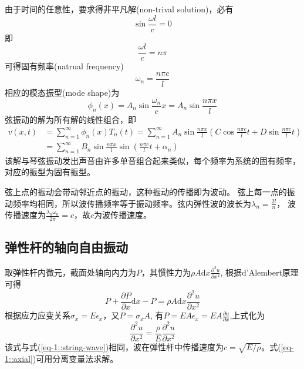 由于时间的任意性，要求得非平凡解(non-trival solution)，必有
\begin{equation}
    \sin \frac{\omega l}{c}=0
\end{equation}
即
\begin{equation}
    \frac{\omega l}{c}=n\pi
\end{equation}
可得固有频率(natrual frequency)
\begin{equation}
    \omega_{n}=\frac{n\pi c}{l}
\end{equation}
相应的模态振型(mode shape)为
\begin{equation}
    \phi_{n}(x)=A_{n}\sin\frac{\omega_{n}}{c}x=A_{n}\sin\frac{n\pi x}{l}
\end{equation}
弦振动的解为所有解的线性组合，即
\begin{equation}
    \begin{aligned}
    v(x,t)&=\sum_{n=1}^{\infty}\phi_{n}(x)T_{n}(t)
    =\sum_{n=1}^{\infty}A_{n}\sin\frac{n\pi x}{l}\left(C\cos \frac{n\pi c}{l} t + D\sin \frac{n\pi c}{l} t\right)\\
    &=\sum_{n=1}^{\infty}B_{n}\sin\frac{n\pi x}{l}\sin \left(\frac{n\pi c}{l}t+\alpha_{n}\right)
    \end{aligned}
\end{equation}
该解与琴弦振动发出声音由许多单音组合起来类似，每个频率为系统的固有频率，对应的振型为固有振型。

弦上点的振动会带动邻近点的振动，这种振动的传播即为波动。
弦上每一点的振动频率均相同，所以波传播频率等于振动频率。弦内弹性波的波长为$\lambda_{n}=\frac{2l}{n}$，
波传播速度为$\frac{\lambda_{n}\omega_{n}}{2\pi}=c$，故$c$为波传播速度。


\subsection{弹性杆的轴向自由振动}

取弹性杆内微元，截面处轴向内力为$P$，其惯性力为$\rho A\mathrm{d}x\frac{\partial^{2}u}{\partial x^{2}}$,
根据d'Alembert原理可得
\begin{equation}
    P+\frac{\partial P}{\partial x}\mathrm{d}x-P=\rho A\mathrm{d}x\frac{\partial^{2}u}{\partial x^{2}}
\end{equation}
根据应力应变关系$\sigma_x=E\epsilon_x$，又$P=\sigma_{x}A$,
有$P=EA\epsilon_x=EA\frac{\partial u}{\partial x}$,上式化为
\begin{equation}\label{eq-1::axial}
    \frac{\partial^{2}u}{\partial x^{2}}=\frac{\rho}{E}\frac{\partial^{2}u}{\partial x^{2}}
\end{equation}
该式与式(\ref{eq-1::string-wave})相同，波在弹性杆中传播速度为$c=\sqrt{E/\rho}$。式(\ref{eq-1::axial})可用分离变量法求解。

